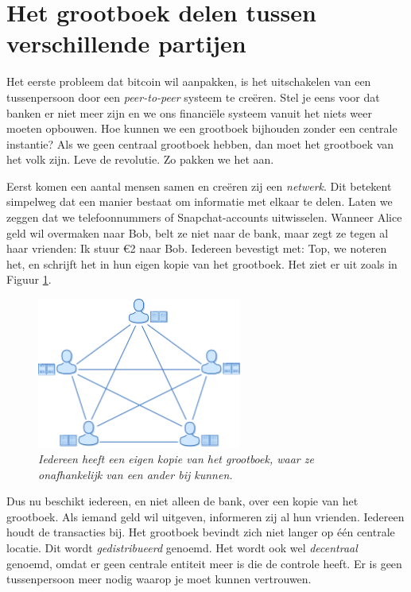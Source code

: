 \section{Het grootboek delen tussen verschillende partijen}

Het eerste probleem dat bitcoin wil aanpakken, is het uitschakelen van een tussenpersoon door een \textit{peer-to-peer} systeem te creëren. Stel je eens voor dat banken er niet meer zijn en we ons financiële systeem vanuit het niets weer moeten opbouwen. Hoe kunnen we een grootboek bijhouden zonder een centrale instantie? Als we geen centraal grootboek hebben, dan moet het grootboek van het volk zijn. Leve de revolutie. Zo pakken we het aan.

Eerst komen een aantal mensen samen en creëren zij een \textit{netwerk}. Dit betekent simpelweg dat een manier bestaat om informatie met elkaar te delen. Laten we zeggen dat we telefoonnummers of Snapchat-accounts uitwisselen. Wanneer Alice geld wil overmaken naar Bob, belt ze niet naar de bank, maar zegt ze tegen al haar vrienden: \textquotedbl{}Ik stuur €2 naar Bob\textquotedbl{}. Iedereen bevestigt met: \textquotedbl{}Top, we noteren het\textquotedbl{}, en schrijft het in hun eigen kopie van het grootboek. Het ziet er uit zoals in Figuur \ref{fig3}.

\begin{figure}[h]
    \centering
    \includegraphics[width=0.6\textwidth]{images/fig3.png}
    \caption{\footnotesize{\textit{Iedereen heeft een eigen kopie van het grootboek, waar ze onafhankelijk van een ander bij kunnen.}}}
    \label{fig3}
\end{figure}

Dus nu beschikt iedereen, en niet alleen de bank, over een kopie van het grootboek. Als iemand geld wil uitgeven, informeren zij al hun vrienden. Iedereen houdt de transacties bij. Het grootboek bevindt zich niet langer op één centrale locatie. Dit wordt \textit{gedistribueerd} genoemd. Het wordt ook wel \textit{decentraal} genoemd, omdat er geen centrale entiteit meer is die de controle heeft. Er is geen tussenpersoon meer nodig waarop je moet kunnen vertrouwen.


